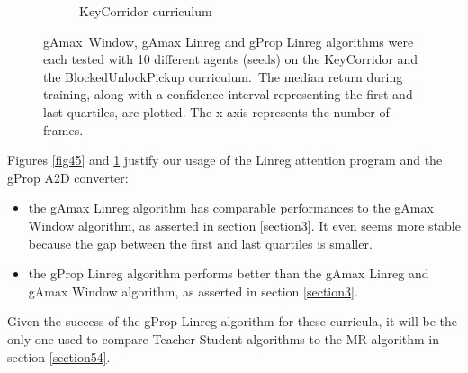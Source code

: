\documentclass{article}
\begin{document}
\begin{figure}
\begin{subfigure}[b]{0.45\textwidth}
         \caption{KeyCorridor curriculum}
         \label{fig46}
     \end{subfigure}
        \caption{gAmax\ Window, gAmax Linreg and gProp Linreg algorithms were each tested with 10 different agents (seeds) on the KeyCorridor and the BlockedUnlockPickup curriculum.\  The median return during training, along with a confidence interval representing the first and last quartiles, are plotted. The x-axis represents the number of frames.}
        \label{fig:two graphs}
\end{figure}

Figures \ref{fig45} and \ref{fig46} justify our usage of the Linreg attention program and the gProp A2D converter:
\begin{itemize}
\item the gAmax Linreg algorithm has comparable performances to the gAmax Window algorithm, as asserted in section \ref{section3}. It even seems more stable because the gap between the first and last quartiles is smaller.
\item the gProp Linreg algorithm performs better than the gAmax Linreg and gAmax Window algorithm, as asserted in section \ref{section3}.
\end{itemize}
Given the success of the gProp Linreg algorithm for these curricula, it will be the only one used to compare Teacher-Student algorithms to the MR algorithm in section \ref{section54}.
\end{document}
